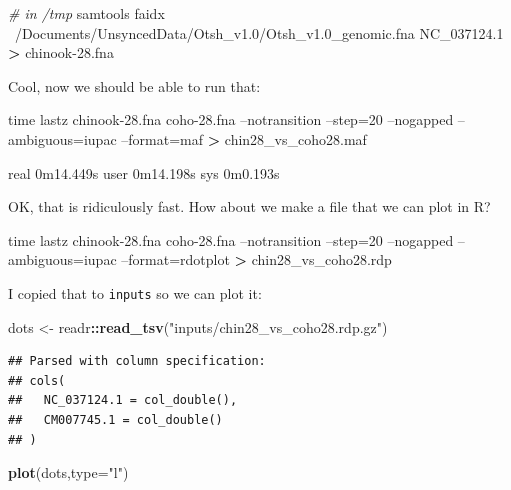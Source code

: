 \documentclass[]{krantz}
\makeatletter
\newenvironment{Shaded}{\begin{snugshade}}{\end{snugshade}}
\newcommand{\BuiltInTok}[1]{#1}
\newcommand{\CommentTok}[1]{\textcolor[rgb]{0.37,0.37,0.37}{\textit{#1}}}
\newcommand{\DataTypeTok}[1]{\textcolor[rgb]{0.27,0.27,0.27}{#1}}
\newcommand{\ExtensionTok}[1]{#1}
\newcommand{\KeywordTok}[1]{\textcolor[rgb]{0.27,0.27,0.27}{\textbf{#1}}}
\newcommand{\NormalTok}[1]{#1}
\newcommand{\OperatorTok}[1]{\textcolor[rgb]{0.43,0.43,0.43}{\textbf{#1}}}
\newcommand{\StringTok}[1]{\textcolor[rgb]{0.5,0.5,0.5}{#1}}
\newenvironment{kframe}{%
\medskip{}
\setlength{\fboxsep}{.8em}
 \def\at@end@of@kframe{}%
 \ifinner\ifhmode%
  \def\at@end@of@kframe{\end{minipage}}%
  \begin{minipage}{\columnwidth}%
 \fi\fi%
 \def\FrameCommand##1{\hskip\@totalleftmargin \hskip-\fboxsep
 \colorbox{shadecolor}{##1}\hskip-\fboxsep
     \hskip-\linewidth \hskip-\@totalleftmargin \hskip\columnwidth}%
 \MakeFramed {\advance\hsize-\width
   \@totalleftmargin\z@ \linewidth\hsize
   \@setminipage}}%
 {\par\unskip\endMakeFramed%
 \at@end@of@kframe}
\renewenvironment{Shaded}{\begin{kframe}}{\end{kframe}}
\makeatother
\begin{document}
\begin{Shaded}
\begin{Highlighting}[]
\CommentTok{# in /tmp}
\ExtensionTok{samtools}\NormalTok{ faidx  ~/Documents/UnsyncedData/Otsh_v1.0/Otsh_v1.0_genomic.fna NC_037124.1 }\OperatorTok{>}\NormalTok{ chinook-28.fna }
\end{Highlighting}
\end{Shaded}

Cool, now we should be able to run that:

\begin{Shaded}
\begin{Highlighting}[]
\BuiltInTok{time}\NormalTok{ lastz chinook-28.fna coho-28.fna --notransition --step=20 --nogapped --ambiguous=iupac --format=maf }\OperatorTok{>}\NormalTok{ chin28_vs_coho28.maf}

\ExtensionTok{real}\NormalTok{    0m14.449s}
\ExtensionTok{user}\NormalTok{    0m14.198s}
\ExtensionTok{sys}\NormalTok{ 0m0.193s}
\end{Highlighting}
\end{Shaded}

OK, that is ridiculously fast. How about we make a file that we can plot in R?

\begin{Shaded}
\begin{Highlighting}[]
\BuiltInTok{time}\NormalTok{ lastz chinook-28.fna coho-28.fna --notransition --step=20 --nogapped --ambiguous=iupac --format=rdotplot }\OperatorTok{>}\NormalTok{ chin28_vs_coho28.rdp}
\end{Highlighting}
\end{Shaded}

I copied that to \texttt{inputs} so we can plot it:

\begin{Shaded}
\begin{Highlighting}[]
\NormalTok{dots <-}\StringTok{ }\NormalTok{readr}\OperatorTok{::}\KeywordTok{read_tsv}\NormalTok{(}\StringTok{"inputs/chin28_vs_coho28.rdp.gz"}\NormalTok{)}
\end{Highlighting}
\end{Shaded}

\begin{verbatim}
## Parsed with column specification:
## cols(
##   NC_037124.1 = col_double(),
##   CM007745.1 = col_double()
## )
\end{verbatim}

\begin{Shaded}
\begin{Highlighting}[]
\KeywordTok{plot}\NormalTok{(dots,}\DataTypeTok{type=}\StringTok{"l"}\NormalTok{)}
\end{Highlighting}
\end{Shaded}
\end{document}
